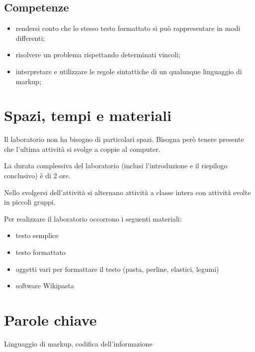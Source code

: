\documentclass[12pt]{article}
\begin{document}
\subsection{Competenze}
\begin{itemize}
\item rendersi conto che lo stesso testo formattato si può rappresentare in modi differenti;
\item risolvere un problema rispettando determinati vincoli;
\item interpretare e utilizzare le regole sintattiche di un qualunque linguaggio di markup;
\end{itemize}
%
%
\section{Spazi, tempi e materiali}
Il laboratorio non ha bisogno di particolari spazi. Bisogna però tenere presente che l'ultima attività si svolge a coppie al computer.

La durata complessiva del laboratorio (inclusi l'introduzione e il riepilogo conclusivo) è di 2 ore.

Nello svolgersi dell'attività si alternano attività a classe intera con attività svolte in piccoli gruppi.

Per realizzare il laboratorio occorrono i seguenti materiali:
\begin{itemize}
\item testo semplice
\item testo formattato
\item oggetti vari per formattare il testo (pasta, perline, elastici, legumi)
\item software Wikipasta
\end{itemize}
%
%
\section{Parole chiave}
Linguaggio di markup, codifica dell'informazione
%
% 
\end{document}
